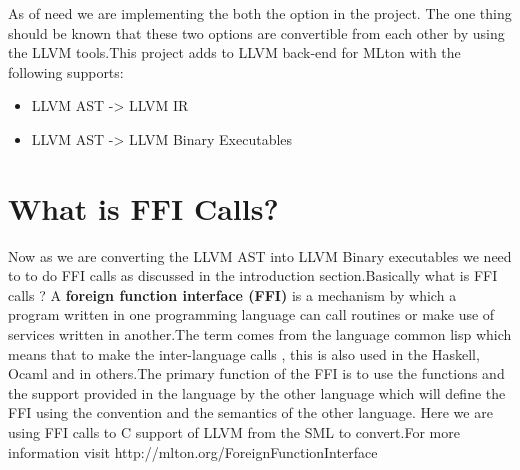 \documentclass[openany]{book}
\begin{document}
	As of need we are implementing the both the option in the project. The one thing should be known that these two options are convertible from each other by using the LLVM tools.This project adds to LLVM back-end for MLton with the following supports:\newline \newline \begin{itemize}
		\item LLVM AST -> LLVM IR
		\item LLVM AST -> LLVM Binary Executables \newline \newline
	\end{itemize}
	
	\section{What is FFI Calls?}
	Now as we are converting the LLVM AST into LLVM Binary executables we need to to do FFI calls as discussed in the introduction section.Basically what is FFI calls ? \newline \newline A \textbf{foreign function interface (FFI)} is a mechanism by which a program written in one programming language can call routines or make use of services written in another.The term comes from the language common lisp which means that to make the inter-language calls , this is also used in the Haskell, Ocaml and in others.\newline \newline The primary function of the FFI is to use the functions and the support provided in the language by the other language which will define the FFI using the convention and the semantics of the other language. Here we are using FFI calls to C support of  LLVM from the SML to convert.\newline \newline For more information visit http://mlton.org/ForeignFunctionInterface
	
	 
\end{document}
